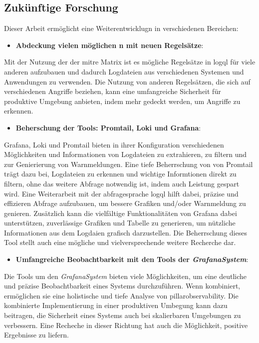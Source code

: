 \subsection{Zukünftige Forschung}
Dieser Arbeit ermöglicht eine Weiterentwicklugn in verschiedenen Bereichen:
 
\begin{itemize}[noitemsep]
    \item \textbf{Abdeckung vielen möglichen n mit neuen Regelsätze}:
\end{itemize}

Mit der Nutzung der  der \gls{mitre} Matrix ist es mögliche Regelsätze in \gls{logql} für viele anderen  aufzubauen und dadurch Logdateien aus verschiedenen Systemen und Anwendungen zu verwenden. Die Nutzung von anderen Regelsätzen, die sich auf verschiedenen Angriffe beziehen, kann eine umfangreiche Sicherheit für produktive Umgebung anbieten, indem mehr  gedeckt werden, um Angriffe zu erkennen.


\begin{itemize}[noitemsep]
    \item \textbf{Beherschung der Tools: Promtail, Loki und Grafana}:
\end{itemize}

Grafana, Loki und Promtail bieten in ihrer Konfiguration verschiedenen Möglichkeiten und Informationen von Logdateien zu extrahieren, zu filtern und zur Genierierung von Warnmeldungen. Eine tiefe Beherrschung von  von Promtail trägt dazu bei, Logdateien zu erkennen und wichtige Informtionen direkt zu filtern, ohne das weitere Abfrage notwendig ist, indem auch Leistung gespart wird. Eine Weiterarbeit mit der \gls{abfragesprache} \gls{logql} hilft dabei, präzise und effizieren Abfrage aufzubauen, um bessere Grafiken und/oder Warnmeldung zu genieren. Zusätzlich kann die vielfältige Funktionalitäten von Grafana dabei unterstützen, zuverlässige Grafiken und Tabelle zu generieren, um nützliche Informationen aus dem Logdaien grafisch darzustellen. Die Beherrschung dieses Tool stellt auch eine mögliche und vielversprechende weitere Recherche dar. 


\begin{itemize}[noitemsep]
    \item \textbf{Umfangreiche Beobachtbarkeit mit den Tools der \textit{\gls{GrafanaSystem}}}:
\end{itemize}

Die Tools um den \textit{\gls{GrafanaSystem}} bieten viele Möglichkeiten, um eine deutliche und präzise Beobachtbarkeit eines Systems durchzuführen. Wenn kombiniert, ermöglichen sie eine holistische und tiefe Analyse von \gls{pillarobservability}. Die kombinierte Implementierung in einer produktiven Umbegung kann dazu beitragen, die Sicherheit eines Systems auch bei skalierbaren Umgebungen zu verbessern. Eine Recheche in dieser Richtung hat auch die Möglichkeit, positive Ergebnisse zu liefern.


